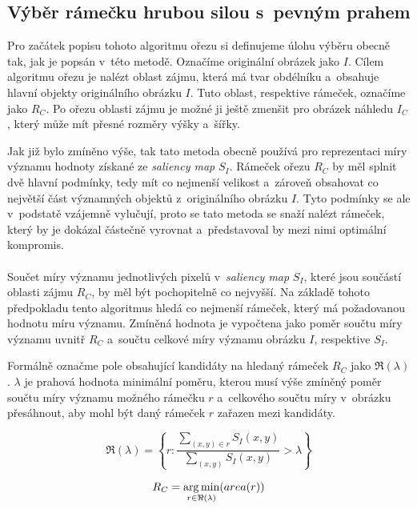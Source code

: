 \subsection{Výběr rámečku hrubou silou s~pevným prahem}
Pro začátek popisu tohoto algoritmu ořezu si definujeme úlohu výběru obecně tak, jak je popsán v~této metodě. Označíme originální obrázek jako  $I$. Cílem algoritmu ořezu je nalézt oblast zájmu, která má tvar obdélníku a~obsahuje hlavní objekty originálního obrázku $I$. Tuto oblast, respektive rámeček, označíme jako $R_C$. Po ořezu oblasti zájmu je možné ji ještě zmenšit pro obrázek náhledu $I_C$, který může mít přesné rozměry výšky a~šířky.

Jak již bylo zmíněno výše, tak tato metoda obecně používá pro reprezentaci míry významu hodnoty získané ze \emph{saliency map} $S_I$. Rámeček ořezu $R_C$ by měl splnit dvě hlavní podmínky, tedy mít co nejmenší velikost a~zároveň obsahovat co největší část významných objektů z~originálního obrázku $I$. Tyto podmínky se ale v~podstatě vzájemně vylučují, proto se tato metoda se snaží nalézt rámeček, který by je dokázal částečně vyrovnat a~představoval by mezi nimi optimální kompromis.

\paragraph{}
Součet míry významu jednotlivých pixelů v~\emph{saliency map} $S_I$, které jsou součástí oblasti zájmu $R_C$, by měl být pochopitelně co nejvyšší. Na základě tohoto předpokladu tento algoritmus hledá co nejmenší rámeček, který má požadovanou hodnotu míru významu. Zmíněná hodnota je vypočtena jako poměr součtu míry významu uvnitř $R_C$ a~součtu celkové míry významu obrázku $I$, respektive $S_I$. 

Formálně označme pole obsahující kandidáty na hledaný rámeček $R_C$ 
jako $\Re(\lambda)$. $\lambda$ je prahová hodnota minimální poměru, kterou musí výše zmíněný poměr součtu míry významu možného rámečku $r$ a~celkového součtu míry v~obrázku přesáhnout, aby mohl být daný rámeček $r$ zařazen mezi kandidáty. 

\begin{equation} \label{equation:2.11}
\Re(\lambda) = \left\{ r: \frac{\sum\limits_{(x,y) \in r}{S_I(x,y)}}{\sum\limits_{(x,y)}{S_I(x,y)}} >\lambda \right\}
\end{equation}

\begin{equation} \label{equation:2.12}
R_C = \operatorname*{arg\,min}_{r \in \Re(\lambda)}(area(r))
\end{equation}

